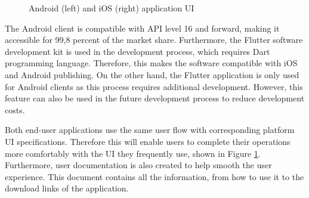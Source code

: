 \begin{figure}[htbp]
\centering
{}
\caption{Android (left) and iOS (right) application UI}
\label{fig:UserApplicationUI}
\end{figure}

The Android client is compatible with API level 16 and forward, making it accessible for 99,8 percent of the market share. Furthermore, the Flutter software development kit is used in the development process, which requires Dart programming language. Therefore, this makes the software compatible with iOS and Android publishing. On the other hand, the Flutter application is only used for Android clients as this process requires additional development. However, this feature can also be used in the future development process to reduce development costs.

Both end-user applications use the same user flow with corresponding platform UI specifications. Therefore this will enable users to complete their operations more comfortably with the UI they frequently use, shown in Figure \ref{fig:UserApplicationUI}. Furthermore, user documentation is also created to help smooth the user experience. This document contains all the information, from how to use it to the download links of the application. 

